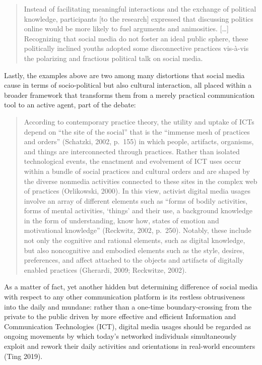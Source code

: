 \documentclass[
  a4paper,
]{book}
\begin{document}
\begin{quote}
Instead of facilitating meaningful interactions and the exchange of political knowledge, participants {[}to the research{]} expressed that discussing politics online would be more likely to fuel arguments and animosities. {[}\ldots{]} Recognizing that social media do not foster an ideal public sphere, these politically inclined youths adopted some disconnective practices vis-à-vis the polarizing and fractious political talk on social media.
\end{quote}

Lastly, the examples above are two among many distortions that social media cause in terms of socio-political but also cultural interaction, all placed within a broader framework that transforms them from a merely practical communication tool to an active agent, part of the debate:

\begin{quote}
According to contemporary practice theory, the utility and uptake of ICTs depend on ``the site of the social'' that is the ``immense mesh of practices and orders'' (Schatzki, 2002, p.~155) in which people, artifacts, organisms, and things are interconnected through practices. Rather than isolated technological events, the enactment and evolvement of ICT uses occur within a bundle of social practices and cultural orders and are shaped by the diverse nonmedia activities connected to these sites in the complex web of practices (Orlikowski, 2000). In this view, activist digital media usages involve an array of different elements such as ``forms of bodily activities, forms of mental activities, `things' and their use, a background knowledge in the form of understanding, know how, states of emotion and motivational knowledge'' (Reckwitz, 2002, p.~250). Notably, these include not only the cognitive and rational elements, such as digital knowledge, but also noncognitive and embodied elements such as the style, desires, preferences, and affect attached to the objects and artifacts of digitally enabled practices (Gherardi, 2009; Reckwitze, 2002).
\end{quote}

As a matter of fact, yet another hidden but determining difference of social media with respect to any other communication platform is its restless obtrusiveness into the daily and mundane: rather than a one-time boundary-crossing from the private to the public driven by more effective and efficient Information and Communication Technologies (ICT), digital media usages should be regarded as ongoing movements by which today's networked individuals simultaneously exploit and rework their daily activities and orientations in real-world encounters {(Ting 2019)}.
\end{document}
